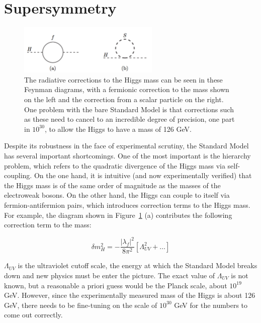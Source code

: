  
 
 
\section{Supersymmetry}

\begin{centering}
    \begin{figure} \center
    \includegraphics[width=0.6\textwidth]{Theory/FeynmanDiagrams/Higgs_mass_corrections.pdf}
    \caption{The radiative corrections to the Higgs mass can be seen
    in these Feynman diagrams, with a fermionic correction to the mass shown on the left and 
    the correction from a scalar particle on the right.  One problem with the bare Standard Model
    is that corrections such as these need to cancel to an incredible
    degree of precision, one part in $10^{30}$, to allow the Higgs to have a mass of 126 GeV. \cite{martin}
    \label{fig:higgs_mass_corrections}}
    \end{figure}
\end{centering}

Despite its robustness in the face of experimental scrutiny, the Standard Model has several important shortcomings.  One of the most important is the hierarchy problem, which refers to the quadratic divergence of the Higgs mass via self-coupling.  On the one hand, it is intuitive (and now experimentally verified) that the Higgs mass is of the same order of magnitude as the masses of the electroweak bosons.  On the other hand, the Higgs can couple to itself via fermion-antifermion pairs, which introduces correction terms to the Higgs mass.  For example, the diagram shown in Figure~\ref{fig:higgs_mass_corrections} (a) contributes the following correction term to the mass:

\begin{equation}
	\delta m_H^2 = -\frac{|\lambda_f |^2}{8\pi^2}[\Lambda_{UV}^2+\ldots]
\end{equation}

$\Lambda_{UV}$ is the ultraviolet cutoff scale, the energy at which the Standard Model breaks down and new physics must be enter the picture.  The exact value of $\Lambda_{UV}$ is not known, but a reasonable a priori guess would be the Planck scale, about $10^{19}$ GeV.  However, since the experimentally measured mass of the Higgs is about 126 GeV, there needs to be fine-tuning on the scale of $10^{30}$ GeV for the numbers to come out correctly.

